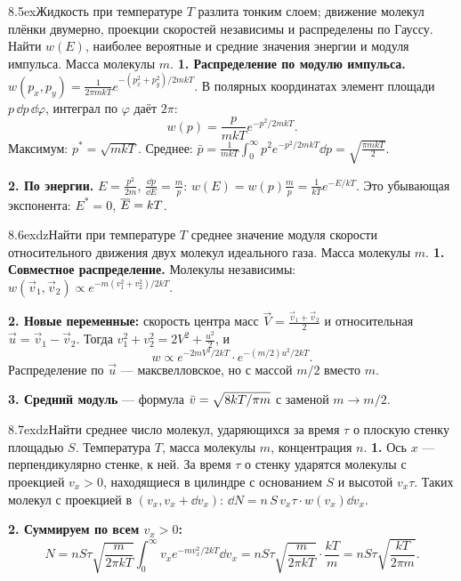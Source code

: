 \begin{problem}{8.5}{ex}{Жидкость при температуре $T$ разлита тонким слоем; движение молекул плёнки двумерно, проекции скоростей независимы
и распределены по Гауссу. Найти $w(E)$, наиболее вероятные и средние значения энергии и модуля импульса. Масса молекулы $m$.}
\textbf{1. Распределение по модулю импульса.} $w(p_x,p_y)=\frac{1}{2\pi mkT}e^{-(p_x^2+p_y^2)/2mkT}$. В полярных координатах
элемент площади $p\,\dd p\,\dd\varphi$, интеграл по $\varphi$ даёт $2\pi$:
\[w(p)=\frac{p}{mkT}e^{-p^2/2mkT}.\]
Максимум: $p^*=\sqrt{mkT}$. Среднее: $\bar p=\frac1{mkT}\int_0^\infty p^2e^{-p^2/2mkT}\dd p=\sqrt{\frac{\pi mkT}2}$.

\textbf{2. По энергии.} $E=\frac{p^2}{2m}$, $\frac{\dd p}{\dd E}=\frac mp$:\; $w(E)=w(p)\frac mp=\frac1{kT}e^{-E/kT}$.
Это убывающая экспонента: $E^*=0$, $\overline{E}=kT$.
\end{problem}

\begin{problem}{8.6}{exdz}{Найти при температуре $T$ среднее значение модуля скорости относительного движения двух молекул идеального газа. Масса молекулы $m$.}
\textbf{1. Совместное распределение.} Молекулы независимы: $w(\vec v_1,\vec v_2)\propto e^{-m(v_1^2+v_2^2)/2kT}$.

\textbf{2. Новые переменные:} скорость центра масс $\vec V=\frac{\vec v_1+\vec v_2}2$ и относительная $\vec u=\vec v_1-\vec v_2$.
Тогда $v_1^2+v_2^2=2V^2+\frac{u^2}{2}$, и
\[w\propto e^{-2mV^2/2kT}\cdot e^{-(m/2)u^2/2kT}.\]
Распределение по $\vec u$ — максвелловское, но с массой $m/2$ вместо $m$.

\textbf{3. Средний модуль} — формула $\bar v=\sqrt{8kT/\pi m}$ с заменой $m\to m/2$.
\end{problem}

\begin{problem}{8.7}{exdz}{Найти среднее число молекул, ударяющихся за время $\tau$ о плоскую стенку площадью $S$. Температура $T$, масса молекулы $m$, концентрация $n$.}
\textbf{1.} Ось $x$ — перпендикулярно стенке, к ней. За время $\tau$ о стенку ударятся молекулы с проекцией $v_x>0$,
находящиеся в цилиндре с основанием $S$ и высотой $v_x\tau$. Таких молекул с проекцией в $(v_x,v_x+\dd v_x)$:
$\dd N=n\,S\,v_x\tau\cdot w(v_x)\dd v_x$.

\textbf{2. Суммируем по всем $v_x>0$:}
\[N=nS\tau\sqrt{\frac{m}{2\pi kT}}\int_0^\infty v_xe^{-mv_x^2/2kT}\dd v_x=nS\tau\sqrt{\frac{m}{2\pi kT}}\cdot\frac{kT}{m}=nS\tau\sqrt{\frac{kT}{2\pi m}}.\]
\end{problem}

